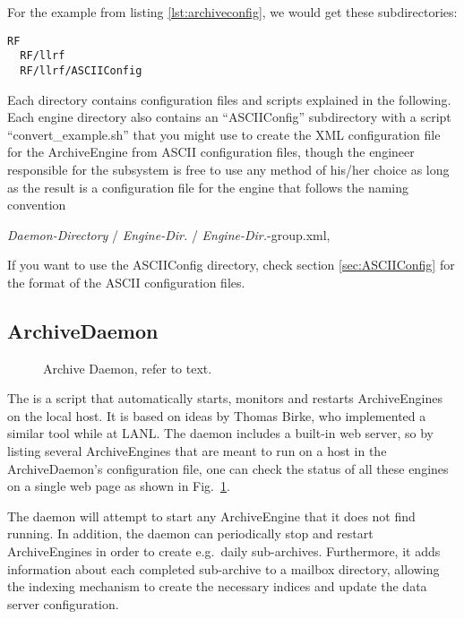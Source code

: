 For the example from listing \ref{lst:archiveconfig}, we would get
these subdirectories:
	\begin{lstlisting}[frame=none,keywordstyle=\sffamily]
  RF
  RF/llrf
  RF/llrf/ASCIIConfig
\end{lstlisting}
\noindent Each directory contains configuration files and scripts
explained in the following. Each engine directory also contains an
``ASCIIConfig'' subdirectory with a script ``convert\_example.sh''
that you might use to create the XML configuration file for the
ArchiveEngine from ASCII configuration files, though the engineer
responsible for the subsystem is free to use any method of his/her
choice as long as the result is a configuration file for the engine
that follows the naming convention
\begin{center}
\emph{Daemon-Directory} / \emph{Engine-Dir.} / \emph{Engine-Dir.}-group.xml,\\
\end{center}
If you want to use the ASCIIConfig directory, check section
\ref{sec:ASCIIConfig} for the format of the ASCII configuration files.

\subsection{ArchiveDaemon} \label{sec:daemon}
\begin{figure}[htb]
\begin{center}
\end{center}
\caption{\label{fig:daemon}Archive Daemon, refer to text.}
\end{figure}

\noindent The  is a script that automatically starts,
monitors and restarts ArchiveEngines on the local host. It is based on
ideas by Thomas Birke, who implemented a similar 
tool while at LANL. The daemon includes a built-in web server, so by
listing several ArchiveEngines that are meant to run on a host in the
ArchiveDaemon's configuration file, one can check the status of all
these engines on a single web page as shown in Fig.~\ref{fig:daemon}.

The daemon will attempt to start any ArchiveEngine
that it does not find running. In addition, the daemon can
periodically stop and restart ArchiveEngines in order to create
e.g.\ daily sub-archives.  Furthermore, it adds information about
each completed sub-archive to a mailbox directory,
allowing the indexing mechanism to create the necessary indices
and update the data server configuration.

